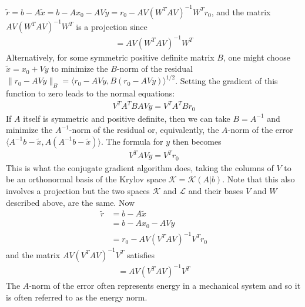 \documentclass[]{article}
\theoremstyle{definition}
\begin{document}
        $\tilde{r} = b - A \tilde{x} = b - A x_0 - AVy = r_0 - AV ( W^T A V )^{-1} W^T r_0$,
        and the matrix $AV ( W^T A V )^{-1} W^T$ is a projection since
        \begin{align}
            [ A V ( W^T A V )^{-1} W^T ] [ A V ( W^T A V )^{-1} W^T ] = A V ( W^T A V )^{-1} W^T
        \end{align}
        Alternatively, for some symmetric positive definite matrix $B$, one might choose $\tilde{x} = x_0 + Vy$ to minimize 
        the $B$-norm of the residual $\| r_0 - A V y \|_B = \langle r_0 - A V y , B ( r_0 - A V y ) \rangle^{1/2}$.  Setting the gradient of this function to zero leads to the normal equations:
        \begin{align}
            V^T A^T BAVy = V^T A^T B r_0
        \end{align}
        If $A$ itself is symmetric and positive definite, then we can take $B = A^{-1}$ and minimize the $A^{-1}$-norm of the 
        residual or, equivalently, the $A$-norm of the error $\langle A^{-1} b - \tilde{x} , A ( A^{-1} b - \tilde{x} ) \rangle$.
        The formula for $y$ then becomes
        \begin{align}\label{eqn:Energy_Norm_Minimization_Conditions}
            V^T A V y = V^T r_0
        \end{align}
        This is what the conjugate gradient algorithm does, taking the columns of $V$ to be an orthonormal basis of the Krylov space $\mathcal{K} = \mathcal{K}(A|b)$.  Note that this also involves a projection but the two spaces $\mathcal{K}$ and $\mathcal{L}$ and their bases $V$ and $W$ described above, are the same. Now
        \begin{align}
            \tilde{r} &= b - A \tilde{x}
            \\
            &= b - A x_0 - A V y
            \\
            &= r_0 - A V ( V^T A V )^{-1} V^T r_0
        \end{align}
        and the matrix $A V ( V^T A V )^{-1} V^T$ satisfies
        \begin{align}
            [A V (V^T A V )^{-1} V^T ] [ A V ( V^T A V )^{-1} V^T ] = A V ( V^T A V )^{-1} V^T
        \end{align}
        The $A$-norm of the error often represents energy in a mechanical system and so it is often referred to as the energy norm.
        
\end{document}
